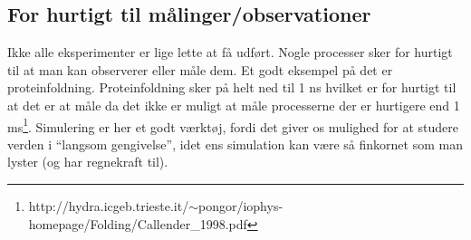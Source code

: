 \subsection{For hurtigt til målinger/observationer}
Ikke alle eksperimenter er lige lette at få udført. Nogle processer sker for 
hurtigt til at man kan observerer eller måle dem. Et godt eksempel på det er 
proteinfoldning. Proteinfoldning sker på helt ned til 1 ns hvilket er for 
hurtigt til at det er at måle da det ikke er muligt at måle processerne der 
er hurtigere end 1
ms\footnote{http://hydra.icgeb.trieste.it/$\sim$pongor/iophys-homepage/Folding/Callender\_1998.pdf}.
Simulering er her et godt værktøj, fordi det giver os mulighed for at studere
verden i ``langsom gengivelse'', idet ens simulation kan være så finkornet som
man lyster (og har regnekraft til).
